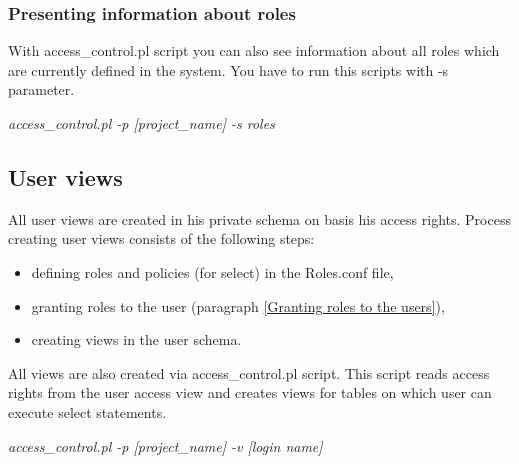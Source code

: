 \subsubsection{Presenting information about roles}
With access\_control.pl script you can also see information about all roles which are currently defined in the system. You have to run this scripts with -s parameter.
\begin{center}
\textit{
access\_control.pl -p [project\_name] -s roles\\}
\end{center}


\subsection{User views\label{User views}} 
All user views are created in his private schema on basis his access rights.
Process creating user views consists of the following steps:
\begin{itemize}
\item defining roles and policies (for select) in the Roles.conf file,
\item granting roles to the user (paragraph \ref{Granting roles to the users}), 
\item creating views in the user schema.
\end{itemize}
All views are also created via access\_control.pl script. This script reads access rights from the user access view and creates views for tables on which user can execute select statements. 

\begin{center}
\textit{access\_control.pl -p [project\_name] -v [login name]}
\end{center}